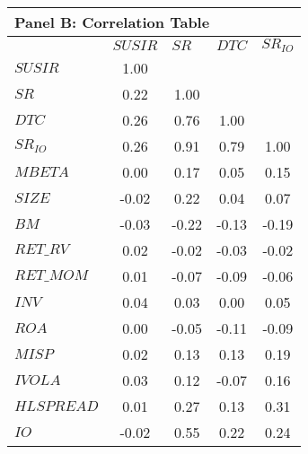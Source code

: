 \begin{tabular}{lcccc}
\hline
\multicolumn{5}{l}{Panel B: Correlation Table} \bigstrut\\
\hline
        & \multicolumn{1}{l}{$SUSIR$} & \multicolumn{1}{l}{$SR$} & \multicolumn{1}{l}{$DTC$} & \multicolumn{1}{l}{$SR_{IO}$} \bigstrut[t]\\
$SUSIR$ & 1.00    &         &         &  \\
$SR$    & 0.22    & 1.00    &         &  \\
$DTC$   & 0.26    & 0.76    & 1.00    &  \\
$SR_{IO}$ & 0.26    & 0.91    & 0.79    & 1.00 \\
$MBETA$ & 0.00    & 0.17    & 0.05    & 0.15 \\
$SIZE$  & -0.02   & 0.22    & 0.04    & 0.07 \\
$BM$    & -0.03   & -0.22   & -0.13   & -0.19 \\
$RET\_RV$ & 0.02    & -0.02   & -0.03   & -0.02 \\
$RET\_MOM$ & 0.01    & -0.07   & -0.09   & -0.06 \\
$INV$   & 0.04    & 0.03    & 0.00    & 0.05 \\
$ROA$   & 0.00    & -0.05   & -0.11   & -0.09 \\
$MISP$  & 0.02    & 0.13    & 0.13    & 0.19 \\
$IVOLA$ & 0.03    & 0.12    & -0.07   & 0.16 \\
$HLSPREAD$ & 0.01    & 0.27    & 0.13    & 0.31 \\
$IO$    & -0.02   & 0.55    & 0.22    & 0.24 \bigstrut[b]\\
\hline
\end{tabular}%
